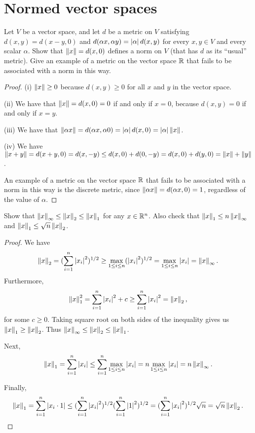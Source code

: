 \section{Normed vector spaces}


\begin{exercise}{16}
Let $V$ be a vector space, and let $d$ be a metric on $V$ satisfying $d(x,y)=d(x-y,0)$ and $d(\alpha x,\alpha y)=\left\lvert \alpha\right\rvert d(x,y)$ for every $x,y\in V$ and every scalar $\alpha$. Show that $\left\lVert x\right\rVert=d(x,0)$ defines a norm on $V$ (that has $d$ as its ``usual'' metric). Give an example of a metric on the vector space $\mathbb{R}$ that fails to be associated with a norm in this way.
\end{exercise}
\begin{proof}
(i) $\left\lVert x\right\rVert\geq 0$ because $d(x,y)\geq 0$ for all $x$ and $y$ in the vector space.

(ii) We have that $\left\lVert x\right\rVert=d(x,0)=0$ if and only if $x=0$, because $d(x,y)=0$ if and only if $x=y$.

(iii) We have that $\left\lVert \alpha x\right\rVert=d(\alpha x, \alpha 0) = \left\lvert \alpha\right\rvert d(x,0)=\left\lvert \alpha\right\rvert\left\lVert x\right\rVert$.

(iv) We have $\left\lVert x+y\right\rVert =d(x+y,0)=d(x,-y)\leq d(x,0)+d(0,-y) =d(x,0)+d(y,0) =\left\lVert x\right\rVert+\left\lVert y\right\rVert$.

An example of a metric on the vector space $\mathbb{R}$ that fails to be associated with a norm in this way is the discrete metric, since $\left\lVert \alpha x\right\rVert =d(\alpha x, 0) =1$, regardless of the value of $\alpha$.
\end{proof} 

\begin{exercise}{18}
Show that $\left\lVert x\right\rVert_\infty\leq \left\lVert x\right\rVert_2\leq\left\lVert x\right\rVert_1$ for any $x\in \mathbb{R}^n$. Also check that $\left\lVert x\right\rVert_1\leq n\left\lVert x\right\rVert_\infty$ and $\left\lVert x\right\rVert_1\leq\sqrt{n}\left\lVert x\right\rVert_2$.
\end{exercise}
\begin{proof}
We have 
\[
\left\lVert x\right\rVert_2 
=(\sum_{i=1}^n\left\lvert x_i\right\rvert^2)^{1/2}
\geq \max_{1\leq i\leq n}(\left\lvert x_i\right\rvert^2)^{1/2}
=\max_{1\leq i\leq n}\left\lvert x_i\right\rvert
=\left\lVert x\right\rVert_\infty.
\]
Furthermore,
\[
\left\lVert x\right\rVert_1^2
=\sum_{i=1}^n\left\lvert x_i\right\rvert^2+c
\geq \sum_{i=1}^n\left\lvert x_i\right\rvert^2
=\left\lVert x\right\rVert_2,
\]
for some $c\geq 0$. Taking square root on both sides of the inequality gives us $\left\lVert x\right\rVert_1\geq \left\lVert x\right\rVert_2$. Thus $\left\lVert x\right\rVert_\infty \leq\left\lVert x\right\rVert_2 \leq\left\lVert x\right\rVert_1$.

Next, 
\[
\left\lVert x\right\rVert_1
=\sum_{i=1}^n\left\lvert x_i\right\rvert
\leq \sum_{i=1}^n\max_{1\leq i\leq n}\left\lvert x_i\right\rvert
= n\max_{1\leq i\leq n}\left\lvert x_i\right\rvert
= n\left\lVert x\right\rVert_\infty.
\]

Finally,
\[
\left\lVert x\right\rVert_1
=\sum_{i=1}^n\left\lvert x_i\cdot 1\right\rvert
\leq (\sum_{i=1}^n\left\lvert x_i\right\rvert^2)^{1/2} (\sum_{i=1}^n\left\lvert 1\right\rvert^2)^{1/2}
= (\sum_{i=1}^n\left\lvert x_i\right\rvert^2)^{1/2}\sqrt{n}
= \sqrt{n}\left\lVert x\right\rVert_2.
\]
\end{proof} 

